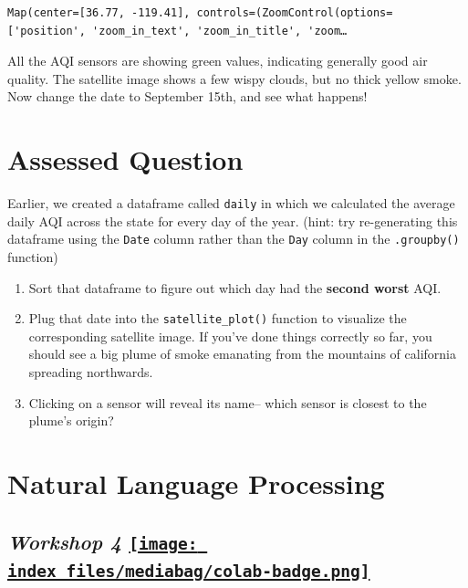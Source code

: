 \documentclass[
  letterpaper,
  DIV=11,
  numbers=noendperiod]{scrreprt}
\providecommand{\tightlist}{%
  \setlength{\itemsep}{0pt}\setlength{\parskip}{0pt}}\usepackage{longtable,booktabs,array}
\begin{document}
\begin{verbatim}
Map(center=[36.77, -119.41], controls=(ZoomControl(options=['position', 'zoom_in_text', 'zoom_in_title', 'zoom…
\end{verbatim}

All the AQI sensors are showing green values, indicating generally good
air quality. The satellite image shows a few wispy clouds, but no thick
yellow smoke. Now change the date to September 15th, and see what
happens!


\hypertarget{assessed-question-2}{%
\chapter{Assessed Question}\label{assessed-question-2}}

Earlier, we created a dataframe called \texttt{daily} in which we
calculated the average daily AQI across the state for every day of the
year. (hint: try re-generating this dataframe using the \texttt{Date}
column rather than the \texttt{Day} column in the \texttt{.groupby()}
function)

\begin{enumerate}
\def\labelenumi{\arabic{enumi}.}
\tightlist
\item
  Sort that dataframe to figure out which day had the \textbf{second
  worst} AQI.
\item
  Plug that date into the \texttt{satellite\_plot()} function to
  visualize the corresponding satellite image. If you've done things
  correctly so far, you should see a big plume of smoke emanating from
  the mountains of california spreading northwards.
\item
  Clicking on a sensor will reveal its name-- which sensor is closest to
  the plume's origin?
\end{enumerate}


\hypertarget{natural-language-processing}{%
\chapter{Natural Language
Processing}\label{natural-language-processing}}

\hypertarget{workshop-4-open-in-colab}{%
\section[\emph{Workshop 4} ]{\texorpdfstring{\emph{Workshop 4}
\href{https://colab.research.google.com/github/oballinger/QM2/blob/main/notebooks/W04.\%20Natural\%20Language\%20Processing.ipynb}{\protect\texttt{[image: index\_files/mediabag/colab-badge.png]}}}{Workshop 4 Open In Colab}}\label{workshop-4-open-in-colab}}
\end{document}
